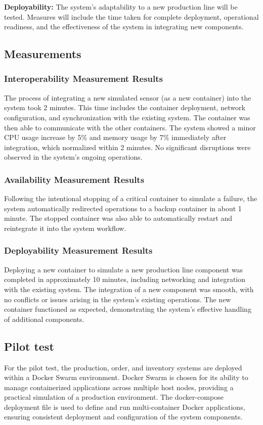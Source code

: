 \documentclass[conference]{IEEEtran}
\begin{document}
\textbf{Deployability:} The system's adaptability to a new production line will be tested. Measures will include the time taken for complete deployment, operational readiness, and the effectiveness of the system in integrating new components.



\subsection{Measurements}
\label{sec:measurements}
\subsubsection*{Interoperability Measurement Results}
The process of integrating a new simulated sensor (as a new container) into the system took 2 minutes. This time includes the container deployment, network configuration, and synchronization with the existing system. The container was then able to communicate with the other containers.
The system showed a minor CPU usage increase by 5\% and memory usage by 7\% immediately after integration, which normalized within 2 minutes. No significant disruptions were observed in the system's ongoing operations.

\subsubsection*{Availability Measurement Results}
Following the intentional stopping of a critical container to simulate a failure, the system automatically redirected operations to a backup container in about 1 minute. The stopped container was also able to automatically restart and reintegrate it into the system workflow.

\subsubsection*{Deployability Measurement Results}
Deploying a new container to simulate a new production line component was completed in approximately 10 minutes, including networking and integration with the existing system.
The integration of a new component was smooth, with no conflicts or issues arising in the system's existing operations. The new container functioned as expected, demonstrating the system's effective handling of additional components.


\subsection{Pilot test}
\label{sec:pilot_test}
For the pilot test, the production, order, and inventory systems are deployed within a Docker Swarm environment. Docker Swarm is chosen for its ability to manage containerized applications across multiple host nodes, providing a practical simulation of a production environment. The docker-compose deployment file is used to define and run multi-container Docker applications, ensuring consistent deployment and configuration of the system components.
\end{document}
